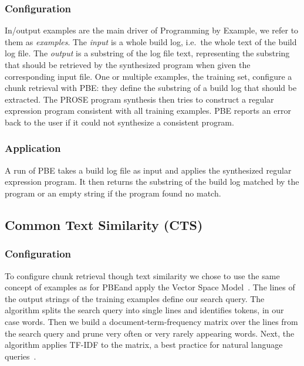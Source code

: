 \subsubsection{Configuration}
In/output examples are the main driver of Programming by Example, we refer to them
as \emph{examples}.
The \emph{input} is a whole build log, i.e.\ the whole text of the build log file.
The \emph{output} is a substring of the log file text, representing the substring that should be retrieved by the synthesized program when given the corresponding input file.
One or multiple examples, the training set, configure a chunk retrieval with PBE:
they define the substring of a build log that should be extracted.
The PROSE program synthesis then tries to construct a regular expression program consistent with all training examples.
PBE reports an error back to the user if it could not synthesize a consistent program.

\subsubsection{Application}
A run of PBE takes a build log file as input and applies the synthesized regular expression program.
It then returns the substring of the build log matched by the program or an empty string if the program found no match.

\subsection{Common Text Similarity (CTS)}
\label{sec:expl-ts}

\subsubsection{Configuration}
To configure chunk retrieval though text similarity we chose to use the same concept of examples as for PBE\@ and apply the Vector Space Model~\cite{schutze2008introduction}.
The lines of the output strings of the training examples define our search query.
The algorithm splits the search query into single lines and identifies tokens, in our case words.
Then we build a document-term-frequency matrix over the lines from the search query and prune very often or very rarely appearing words.
Next, the algorithm applies TF-IDF to the matrix, a best practice for natural language queries~\cite{lee1997document}.

